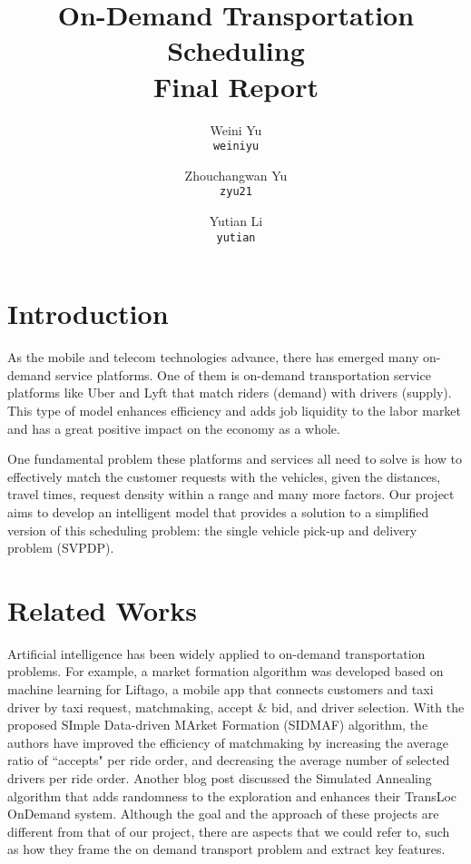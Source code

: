 \documentclass{article}
\title{On-Demand Transportation Scheduling \\ \large{Final Report}}
\author{Weini Yu\\\texttt{weiniyu}\and Zhouchangwan Yu\\\texttt{zyu21}\and Yutian Li\\\texttt{yutian}}
\begin{document}
\maketitle
\tableofcontents

\pagebreak
{}
\section{Introduction}

As the mobile and telecom technologies advance, there has emerged many on-demand service platforms. One of them is on-demand transportation service platforms like Uber and Lyft that match riders (demand) with drivers (supply). This type of model enhances efficiency and adds job liquidity to the labor market and has a great positive impact on the economy as a whole.

One fundamental problem these platforms and services all need to solve is how to effectively match the customer requests with the vehicles, given the distances, travel times, request density within a range and many more factors. Our project aims to develop an intelligent model that provides a solution to a simplified version of this scheduling problem: the single vehicle pick-up and delivery problem (SVPDP)\cite{SVPDP}.

\section{Related Works}

Artificial intelligence has been widely applied to on-demand transportation problems. For example, a market formation algorithm was developed based on machine learning for Liftago, a mobile app that connects customers and taxi driver by taxi request, matchmaking, accept \& bid, and driver selection\cite{Liftago}. With the proposed SImple Data-driven MArket Formation (SIDMAF) algorithm, the authors have improved the efficiency of matchmaking by increasing the average ratio of ``accepts" per ride order, and decreasing the average number of selected drivers per ride order. Another blog post discussed the Simulated Annealing algorithm that adds randomness to the exploration and enhances their TransLoc OnDemand system\cite{TransLoc}. Although the goal and the approach of these projects are different from that of our project, there are aspects that we could refer to, such as how they frame the on demand transport problem and extract key features.
\end{document}
